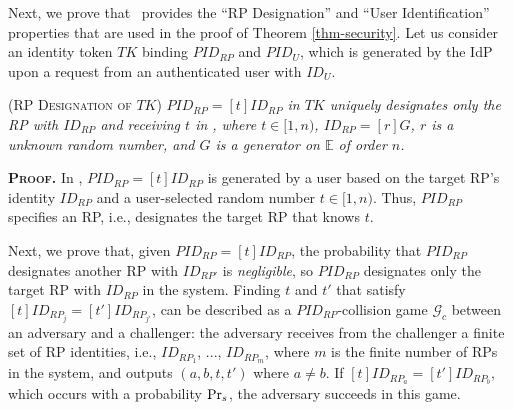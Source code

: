 
\vspace{1.5mm}
Next, we prove that \usso\ provides the ``RP Designation'' and ``User Identification'' properties that are used in the proof of Theorem \ref{thm-security}. Let us consider an identity token $TK$ binding $PID_{RP}$ and $PID_U$, which is generated by the IdP upon a request from an authenticated user with $ID_U$.

\begin{lemma}
\textsc{(RP Designation of $TK$)}  \emph{$PID_{RP}= [t]ID_{RP}$ in $TK$ uniquely designates only the RP with $ID_{RP}$ and receiving $t$ in \usso, where $t \in [1,n)$, $ID_{RP} = [r]G$, $r$ is a unknown random number, and $G$ is a generator on $\mathbb{E}$ of order $n$.}
\label{lemma-rp-designation}
\end{lemma}

\noindent\textbf{\textsc{Proof.}} In \usso, $PID_{RP}=[t]ID_{RP}$ is generated by a user based on the target RP's identity $ID_{RP}$ and a user-selected random number $t \in [1,n)$.
Thus, $PID_{RP}$ specifies an RP, i.e., %
designates the target RP that knows $t$. 

Next, we prove that, given $PID_{RP} = [t]ID_{RP}$, the probability that $PID_{RP}$ designates another RP with $ID_{RP'}$ is \emph{negligible}, %
so $PID_{RP}$ designates only the target RP with $ID_{RP}$ in the system.
Finding $t$ and $t'$ that satisfy $[t]ID_{RP_j} = [t']ID_{RP_{j'}}$, can be described as a $PID_{RP}$-collision game $\mathcal{G}_c$ between an adversary and a challenger: the adversary receives from the challenger a finite set of RP identities, i.e., $ID_{RP_1}$, ..., $ID_{RP_m}$, where $m$ is the  finite number of RPs in the system, and outputs $(a, b, t, t')$ where $a \neq b$. If $[t]ID_{RP_a}=[t']ID_{RP_b}$, which occurs with a probability ${\rm Pr}_s$, the adversary succeeds in this game.

